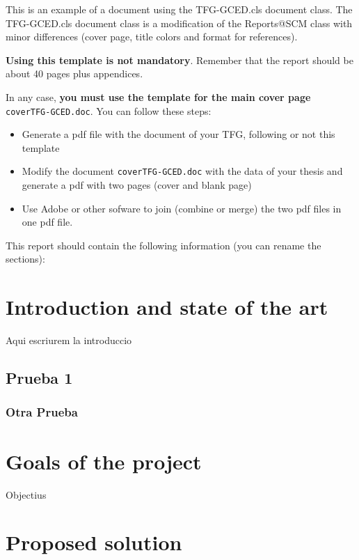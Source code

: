 \documentclass[12,twoside]{TFG-GCED}
\begin{document}
\maketitle

This is an example of a document using the TFG-GCED.cls document class. The TFG-GCED.cls document class is a modification of the Reports@SCM class with minor differences (cover page, title colors and format for references).

\textbf{Using this template is not mandatory}. Remember that the report should be about 40 pages plus appendices.

In any case, \textbf{you must use the template for the main cover page} \texttt{coverTFG-GCED.doc}. You can follow these steps:
\begin{itemize}
	\item Generate a pdf file with the document of your TFG, following or not this template
	\item Modify the document \texttt{coverTFG-GCED.doc} with the data of your thesis and generate a pdf with two pages (cover and blank page)
	\item Use Adobe or other sofware to join (combine or merge) the two pdf files in one pdf file.
\end{itemize}

\newpage
This report should contain the following information (you can rename the sections):
\continguts


\newpage
\color{black}
\section{Introduction and state of the art}
Aqui escriurem la introduccio

\subsection{Prueba 1}
\subsubsection{Otra Prueba}

\section{Goals of the project}
Objectius
\section{Proposed solution}
\end{document}
